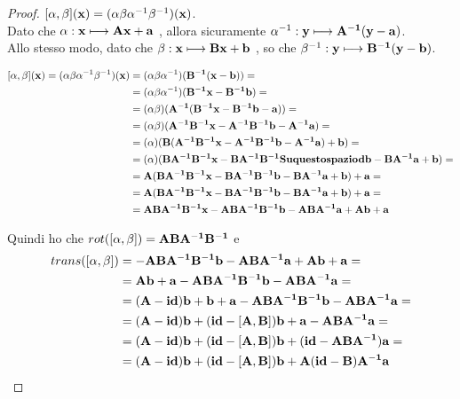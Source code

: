 \documentclass[10pt,a4paper]{article}
\begin{document}
\begin{proof}
	$ [ \alpha, \beta ](\vb{x}) = ( \alpha \beta \alpha^{-1} \beta^{-1} ) (\vb{x})$. \\
	Dato che $ \alpha : \vb{x} \longmapsto \vb{Ax + a}$ , allora sicuramente  $\alpha^{-1}: \vb{y} \longmapsto \vb{A^{-1}(y-a)}$.  \\
	Allo stesso modo, dato che $ \beta : \vb{x} \longmapsto \vb{Bx + b}$ , so che $\beta^{-1}: \vb{y} \longmapsto \vb{B^{-1}(y-b)}$. 

\begin{equation*}
\begin{split}
[ \alpha, \beta ](\vb{x}) = (\alpha \beta \alpha^{-1} \beta^{-1} ) (\vb{x})
& = (\alpha \beta \alpha^{-1})( \vb{B^{-1}(x-b)}) = \\ 
& = (\alpha \beta \alpha^{-1})( \vb{B^{-1}x- B^{-1}b }) = \\ 
& = (\alpha \beta)(\vb{A^{-1}( B^{-1}x- B^{-1}b -a)})= \\
& =  (\alpha \beta)(\vb{A^{-1} B^{-1}x- A^{-1}B^{-1}b -A^{-1}a})  = \\
& = (\alpha)(\vb{B(A^{-1} B^{-1}x- A^{-1}B^{-1}b -A^{-1}a) +b}) = \\
& = (\alpha)(\vb{BA^{-1} B^{-1}x-BA^{-1}B^{-1}Su questo spazio db -BA^{-1}a +b}) = \\
& = \vb{A(BA^{-1} B^{-1}x-BA^{-1}B^{-1}b -BA^{-1}a +b) + a} = \\
& = \vb{A(BA^{-1} B^{-1}x-BA^{-1}B^{-1}b -BA^{-1}a +b) + a} = \\
& = \vb{ABA^{-1} B^{-1}x-ABA^{-1}B^{-1}b -ABA^{-1}a +Ab + a }
\end{split}
\end{equation*}

Quindi ho che $ rot([ \alpha , \beta ]) = \vb{ABA^{-1} B^{-1} }$ e
\begin{equation*}
\begin{split}
trans([ \alpha, \beta ]) & = \vb{-ABA^{-1}B^{-1}b -ABA^{-1}a +Ab + a }= \\
& = \vb{Ab + a -ABA^{-1}B^{-1}b -ABA^{-1}a }= \\
& = \vb{(A-id)b + b + a -ABA^{-1}B^{-1}b -ABA^{-1}a} = \\
& = \vb{(A-id)b + (id-[A,B])b + a - ABA^{-1}a} = \\
& = \vb{(A-id)b + (id-[A,B])b + (id- ABA^{-1})a }= \\
& = \vb{(A-id)b + (id-[A,B])b + A(id- B)A^{-1}a} 
\end{split}
\end{equation*}
	
\end{proof}
\end{document}
